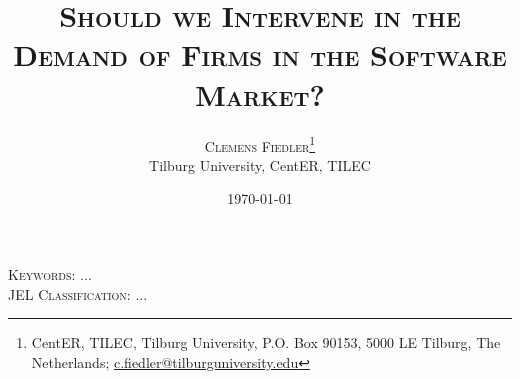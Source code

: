 \documentclass[a4paper, 11pt]{article}
\title{\textsc{Should we Intervene in the Demand of Firms in the Software Market?}}
\author{
  \textsc{Clemens Fiedler}\thanks{
    CentER, TILEC, Tilburg University, P.O. Box 90153, 5000 LE Tilburg, The Netherlands; \href{mailto:c.fiedler@tilburguniversity.edu}{c.fiedler@tilburguniversity.edu}}\\
  Tilburg University, CentER, TILEC}
\date{\today}
\begin{document}
  \maketitle


  \noindent\textsc{Keywords:} ...\\
  \noindent\textsc{JEL Classification:} ...

  \newpage
  
\end{document}
